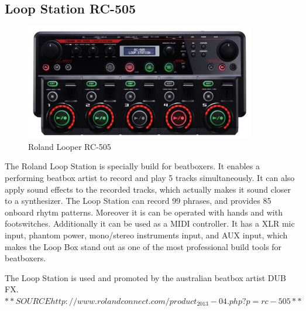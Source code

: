 \subsection{ Loop Station RC-505 }
\begin{figure}[h]
	\begin{center}
		\includegraphics[height=5cm]{fig/Roland-RC-505.JPG}
		\caption{Roland Looper RC-505}
		\label{Looper}
	\end{center}
\end{figure}
The Roland Loop Station is specially build for beatboxers. It enables a performing beatbox artist to record and play 5 tracks simultaneously. It can also apply sound effects to the recorded tracks, which actually makes it sound closer to a synthesizer. The Loop Station can record 99 phrases, and provides 85 onboard rhytm patterns. Moreover it is can be operated with hands and with footswitches. Additionally it can be used as a MIDI controller. It has a XLR mic input, phantom power, mono/stereo instruments input, and AUX input, which makes the Loop Box stand out as one of the most professional build tools for beatboxers.

The Loop Station is used and promoted by the australian beatbox artist DUB FX.$**SOURCE http://www.rolandconnect.com/product_2013-04.php?p=rc-505 **$


